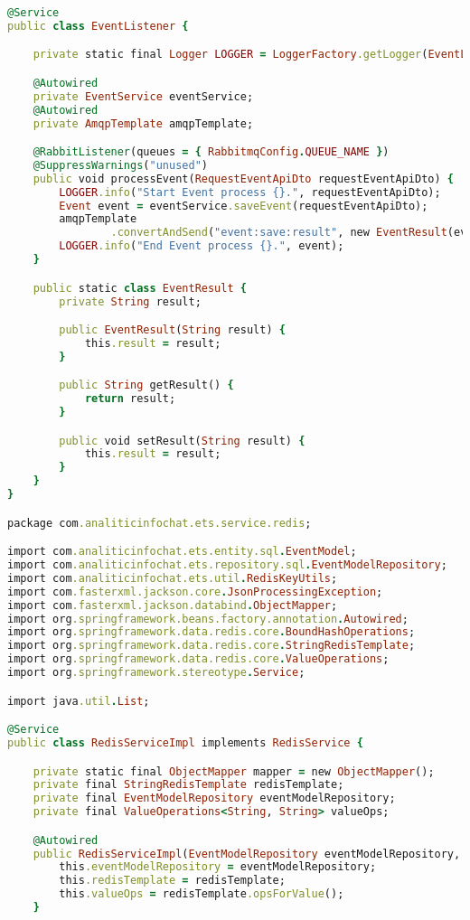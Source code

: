 \begin{lstlisting}[language=Ruby, style=rubystyle]
@Service
public class EventListener {

    private static final Logger LOGGER = LoggerFactory.getLogger(EventListener.class);

    @Autowired
    private EventService eventService;
    @Autowired
    private AmqpTemplate amqpTemplate;

    @RabbitListener(queues = { RabbitmqConfig.QUEUE_NAME })
    @SuppressWarnings("unused")
    public void processEvent(RequestEventApiDto requestEventApiDto) {
        LOGGER.info("Start Event process {}.", requestEventApiDto);
        Event event = eventService.saveEvent(requestEventApiDto);
        amqpTemplate
                .convertAndSend("event:save:result", new EventResult(event != null ? event.toString() : "not saved"));
        LOGGER.info("End Event process {}.", event);
    }

    public static class EventResult {
        private String result;

        public EventResult(String result) {
            this.result = result;
        }

        public String getResult() {
            return result;
        }

        public void setResult(String result) {
            this.result = result;
        }
    }
}

package com.analiticinfochat.ets.service.redis;

import com.analiticinfochat.ets.entity.sql.EventModel;
import com.analiticinfochat.ets.repository.sql.EventModelRepository;
import com.analiticinfochat.ets.util.RedisKeyUtils;
import com.fasterxml.jackson.core.JsonProcessingException;
import com.fasterxml.jackson.databind.ObjectMapper;
import org.springframework.beans.factory.annotation.Autowired;
import org.springframework.data.redis.core.BoundHashOperations;
import org.springframework.data.redis.core.StringRedisTemplate;
import org.springframework.data.redis.core.ValueOperations;
import org.springframework.stereotype.Service;

import java.util.List;

@Service
public class RedisServiceImpl implements RedisService {

    private static final ObjectMapper mapper = new ObjectMapper();
    private final StringRedisTemplate redisTemplate;
    private final EventModelRepository eventModelRepository;
    private final ValueOperations<String, String> valueOps;

    @Autowired
    public RedisServiceImpl(EventModelRepository eventModelRepository, StringRedisTemplate redisTemplate) {
        this.eventModelRepository = eventModelRepository;
        this.redisTemplate = redisTemplate;
        this.valueOps = redisTemplate.opsForValue();
    }


\end{lstlisting}
